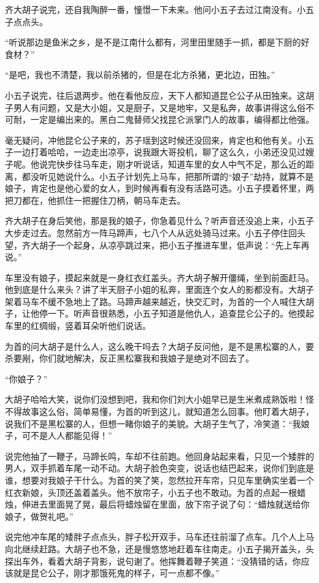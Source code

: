 齐大胡子说完，还自我陶醉一番，憧憬一下未来。他问小五子去过江南没有。小五子点点头。

“听说那边是鱼米之乡，是不是江南什么都有，河里田里随手一抓，都是下厨的好食材？”

“是吧，我也不清楚，我以前杀猪的，但是在北方杀猪，更北边，田独。”

小五子说完，往后退两步。他在看他反应，天下人都知道昆仑公子从田独来。这胡子男人有问题，又是大小姐，又是厨子，又是地牢，又是私奔，故事讲得这么俗不可耐，一定是编出来的。黑白二鬼替师父找昆仑派掌门人的故事，编得都比他强。

毫无疑问，冲他昆仑公子来的，苏子瑶到这时候还没回来，肯定也和他有关。小五子一边打着哈哈，一边走出凉亭，说我跟大哥投机，聊了这么久，小弟还没见过嫂子呢。他说完快步往马车走，刚才听说话，知道车里的女人中气不足，那么近的距离，都没听见她说什么。小五子计划先上马车，把那所谓的“娘子”劫持，就算不是娘子，肯定也是他心爱的女人，到时候再看有没有活路可选。小五子摸着怀里，两把刀都在，他抓住一把握住刀柄，朝马车走去。

齐大胡子在身后笑他，那是我的娘子，你急着见什么？听声音还没追上来，小五子大步走过去。忽然前方一阵马蹄声，七八个人从远处骑马过来。小五子停住回头望，齐大胡子一个起身，从凉亭跳过来，把小五子推进车里，低声说：“先上车再说。”

车里没有娘子，摸起来就是一身红衣红盖头。齐大胡子解开僵绳，坐到前面赶马。他到底是什么来头？讲了半天厨子小姐的私奔，里面连个女人的影都没有。大胡子架着马车不缓不急地上了路。马蹄声越来越近，快交汇时，为首的一个人喊住大胡子，让他停一下。听声音很熟悉，小五子知道是他仇人，追查昆仑公子的。他摸起车里的红绸缎，竖着耳朵听他们说话。

为首的问大胡子是什么人，这么晚干吗去？大胡子反问他，是不是黑松寨的人，要杀要剐，你们就地解决，反正黑松寨我和我娘子是绝对不回去了。

“你娘子？”

大胡子哈哈大笑，说你们没想到吧，我和你们刘大小姐早已是生米煮成熟饭啦！怪不得故事这么俗，简单易懂，为首的听到这儿，就知道怎么回事。他盯着大胡子，说我们不是黑松寨的人，但想一睹你娘子的美貌。大胡子生气了，冷笑道：“我娘子，可不是人人都能见得！”

说完他抽了一鞭子，马蹄长鸣，车却不往前跑。他回身站起来看，只见一个矮胖的男人，双手抓着车尾一动不动。大胡子脸色突变，说话也结巴起来，说你们到底是谁，想要对我娘子干什么。为首的笑了笑，忽然拉开车帘，只见车里确实坐着一个红衣新娘，头顶还盖着盖头。他不放帘子，小五子也不敢动。为首的点起一根蜡烛，伸进去里面晃了晃，最后将蜡烛留在里面，放下帘子说了句：“蜡烛就送给你娘子，做贺礼吧。”

说完他冲车尾的矮胖子点点头，胖子松开双手，马车还往前溜了点车。几个人上马向北继续赶路。大胡子也不急，还是慢悠悠地赶着车往南走。小五子揭开盖头，头探出车外，看着大胡子背影，说句谢了。他挥舞着鞭子笑道：“没猜错的话，你应该就是昆仑公子，刚才那饿死鬼的样子，可一点都不像。”

